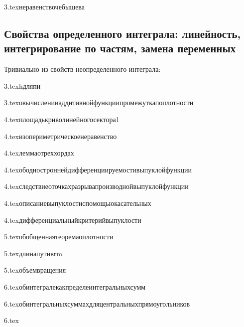 {3.tex}{неравенствочебышева}

\subsection{Свойства определенного интеграла: линейность, интегрирование по частям, замена переменных}
Тривиально из свойств неопределенного интеграла: 

{3.tex}{hдляпи}

{3.tex}{овычисленииаддитивнойфункциипромежуткапоплотности}

{4.tex}{площадькриволинейногосектора1}

{4.tex}{изопериметрическоенеравенство}

{4.tex}{леммаотреххордах}

{4.tex}{ободностроннейдифференциируемостивыпуклойфункции}

{4.tex}{следствиеоточкахразрывапроизводнойвыпуклойфункции}

{4.tex}{описаниевыпуклостиспомощьюкасательных}

{4.tex}{дифференциальныйкритерийвыпуклости}

{5.tex}{обобщеннаятеоремаоплотности}

{5.tex}{длинапутивrm}

{5.tex}{объемвращения}

{6.tex}{обинтегралекакпределеинтегральныхсумм}

{6.tex}{обинтегральныхсуммахдляцентральныхпрямоугольников}

{6.tex}{}

